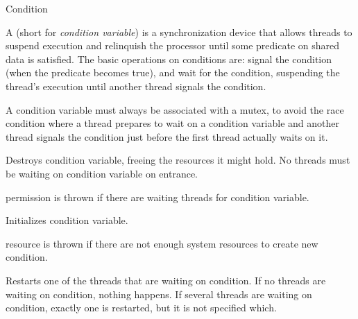 
\begin{classpage}{Condition}

A  (short for {\em condition variable}) is a
synchronization device that allows threads to suspend execution and
relinquish the processor until some predicate on shared data is
satisfied. The basic operations on conditions are: signal the
condition (when the predicate becomes true), and wait for the
condition, suspending the thread's execution until another thread
signals the condition.

A condition variable must always be associated with a mutex, to avoid
the race condition where a thread prepares to wait on a condition
variable and another thread signals the condition just before the
first thread actually waits on it.


\begin{mandescription}
  \destructor
  Destroys  condition variable, freeing the resources it
  might hold. No threads must be waiting on  condition
  variable on entrance.
  \begin{exception}
    \item[permission] is thrown if there are waiting
      threads for  condition variable.
  \end{exception}

  Initializes  condition variable.
  \begin{exception}
    \item[resource] is thrown if there are not
      enough system resources to create  new condition.
  \end{exception}

  Restarts one of the threads that are waiting on 
  condition. If no threads are waiting on  condition,
  nothing happens. If several threads are waiting on 
  condition, exactly one is restarted, but it is not specified
  which.


\end{mandescription}
\end{classpage}
